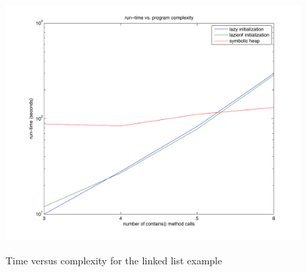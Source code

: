 \begin{figure}[htb]
\scalebox{0.45}
{\includegraphics[width=563px]{../figs/time_vs_complexity.pdf}}
\caption{Time versus complexity for the linked list example}
\label{fig:tvc}
\end{figure}

